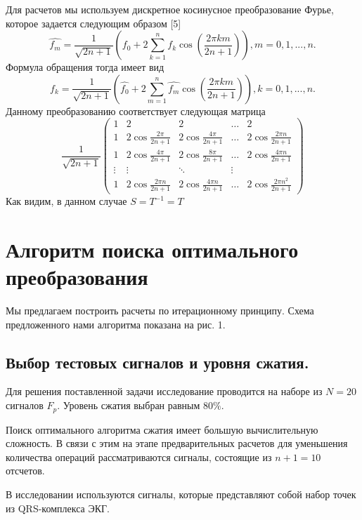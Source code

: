 \documentclass[11pt, oneside, a4paper]{article}
\begin{document}
Для расчетов мы используем дискретное косинусное преобразование Фурье, которое задается следующим образом [5]
\begin{equation}
\label{DCT}
\hat{f_m}=\frac{1}{\sqrt{2n+1}}(f_0+2\sum\limits_{k=1}^{n}f_k\cos(\frac{2 \pi k m}{2n+1})), m=0,1,...,n.
\end{equation}
Формула обращения тогда имеет вид
\begin{equation}
\label{inverseDCT}
f_k=\frac{1}{\sqrt{2n+1}}(\hat{f_0}+2\sum\limits_{m=1}^{n}\hat{f_m}\cos(\frac{2 \pi k m}{2n+1})), k=0,1,...,n.
\end{equation}
Данному преобразованию соответствует следующая матрица
\begin{equation}
\label{matrixDCT}
\frac{1}{\sqrt{2n+1}}\begin{pmatrix}
1 & 2 & 2 & \ldots & 2\\
1 & 2\cos\frac{2 \pi}{2n+1} & 2\cos\frac{4 \pi}{2n+1} & \ldots & 2\cos\frac{2 \pi n}{2n+1}\\
1 & 2\cos\frac{4 \pi}{2n+1} & 2\cos\frac{8 \pi}{2n+1} & \ldots & 2\cos\frac{4 \pi n}{2n+1}\\
\vdots & \vdots & \ddots & \vdots\\
1 & 2\cos\frac{2 \pi n}{2n+1} & 2\cos\frac{4 \pi n}{2n+1} & \ldots & 2\cos\frac{2 \pi n^2}{2n+1}
\end{pmatrix}
\end{equation}
Как видим, в данном случае $S=T^{-1}=T$

\section{Алгоритм поиска оптимального преобразования}

Мы предлагаем построить расчеты по итерационному принципу. Схема предложенного нами алгоритма показана на рис. 1.

\subsection{Выбор тестовых сигналов и уровня сжатия.}
Для решения поставленной задачи исследование проводится на наборе из $N=20$ сигналов $F_p$. Уровень сжатия выбран равным $80\%$. 

Поиск оптимального алгоритма сжатия имеет большую вычислительную сложность. В связи с этим на этапе предварительных расчетов для уменьшения количества операций рассматриваются сигналы, состоящие из $n+1=10$ отсчетов. 

В исследовании используются сигналы, которые представляют собой набор точек из QRS-комплекса ЭКГ.
\end{document}
